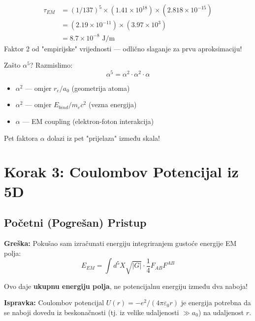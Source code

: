 \documentclass[12pt,a4paper]{article}
\begin{document}
\begin{numerical}
\begin{align*}
\tau_{EM} &= (1/137)^5 \times (1.41 \times 10^{18}) \times (2.818 \times 10^{-15}) \\
&= (2.19 \times 10^{-11}) \times (3.97 \times 10^{3}) \\
&= 8.7 \times 10^{-8} \text{ J/m}
\end{align*}
Faktor 2 od "empirijske" vrijednosti — odlično slaganje za prvu aproksimaciju!
\end{numerical}

\begin{insight}
Zašto $\alpha^5$? Razmislimo:
\begin{equation}
\alpha^5 = \alpha^2 \cdot \alpha^2 \cdot \alpha
\end{equation}
\begin{itemize}
    \item $\alpha^2$ — omjer $r_e/a_0$ (geometrija atoma)
    \item $\alpha^2$ — omjer $E_{bind}/m_e c^2$ (vezna energija)
    \item $\alpha$ — EM coupling (elektron-foton interakcija)
\end{itemize}
Pet faktora $\alpha$ dolazi iz pet "prijelaza" između skala!
\end{insight}

\section{Korak 3: Coulombov Potencijal iz 5D}

\subsection{Početni (Pogrešan) Pristup}

\begin{correction}
\textbf{Greška:} Pokušao sam izračunati energiju integriranjem gustoće energije EM polja:
\begin{equation}
E_{EM} = \int d^5X \sqrt{|G|} \cdot \frac{1}{4} F_{AB} F^{AB}
\end{equation}

Ovo daje \textbf{ukupnu energiju polja}, ne potencijalnu energiju između dva naboja!

\textbf{Ispravka:} Coulombov potencijal $U(r) = -e^2/(4\pi\varepsilon_0 r)$ je energija potrebna da se naboji dovedu iz beskonačnosti (tj. iz velike udaljenosti $\gg a_0$) na udaljenost $r$.
\end{correction}
\end{document}
